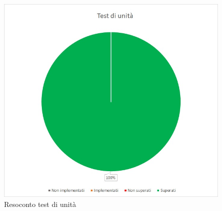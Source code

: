 \renewcommand{\arraystretch}{1}
\begin{figure} [H]
	\centering
	\includegraphics[scale=0.7]{Img/TU}
	\caption{Resoconto test di unità}\label{}
\end{figure}


\pagebreak